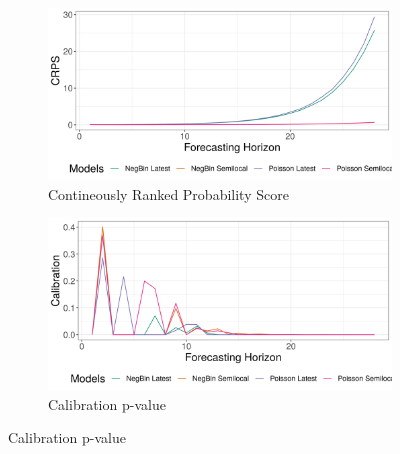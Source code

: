 \begin{figure}[H]
\begin{subfigure}{0.5\textwidth}
  \centering
  \includegraphics[width=\linewidth]{../output/Kayina_crps.png}  
  \caption{Contineously Ranked Probability Score}
  \label{fig:sub-first}
\end{subfigure}
\begin{subfigure}{0.5\textwidth}
  \centering
  \includegraphics[width=\linewidth]{../output/Kayina_calibration.png}  
  \caption{Calibration p-value}
  \label{fig:sub-second}
\end{subfigure}


\end{figure}
